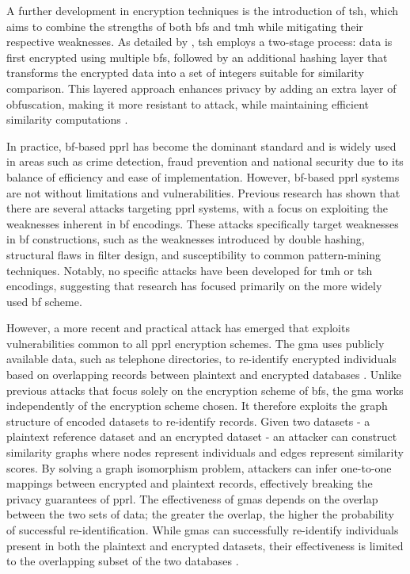A further development in encryption techniques is the introduction of \ac{tsh}, which aims to combine the strengths of both \ac{bf}s and \ac{tmh} while mitigating their respective weaknesses.
As detailed by \cite{ranbaduge2020secure}, \ac{tsh} employs a two-stage process: data is first encrypted using multiple \ac{bf}s, followed by an additional hashing layer that transforms the encrypted data into a set of integers suitable for similarity comparison. 
This layered approach enhances privacy by adding an extra layer of obfuscation, making it more resistant to attack, while maintaining efficient similarity computations \cite{vidanage2020graph, ranbaduge2020secure}.

In practice, \ac{bf}-based \ac{pprl} has become the dominant standard and is widely used in areas such as crime detection, fraud prevention and national security due to its balance of efficiency and ease of implementation.
However, \ac{bf}-based \ac{pprl} systems are not without limitations and vulnerabilities. 
Previous research has shown that there are several attacks targeting \ac{pprl} systems, with a focus on exploiting the weaknesses inherent in \ac{bf} encodings.
These attacks specifically target weaknesses in \ac{bf} constructions, such as the weaknesses introduced by double hashing, structural flaws in filter design, and susceptibility to common pattern-mining techniques. 
Notably, no specific attacks have been developed for \ac{tmh} or \ac{tsh} encodings, suggesting that research has focused primarily on the more widely used \ac{bf} scheme. \cite{vidanage2020graph}

However, a more recent and practical attack has emerged that exploits vulnerabilities common to all \ac{pprl} encryption schemes. 
The \ac{gma} uses publicly available data, such as telephone directories, to re-identify encrypted individuals based on overlapping records between plaintext and encrypted databases \cite{vidanage2020graph, schaefer2024}. 
Unlike previous attacks that focus solely on the encryption scheme of \ac{bf}s, the \ac{gma} works independently of the encryption scheme chosen.
It therefore exploits the graph structure of encoded datasets to re-identify records. Given two datasets - a plaintext reference dataset and an encrypted dataset - an attacker can construct similarity graphs where nodes represent individuals and edges represent similarity scores. 
By solving a graph isomorphism problem, attackers can infer one-to-one mappings between encrypted and plaintext records, effectively breaking the privacy guarantees of \ac{pprl}. 
The effectiveness of \ac{gma}s depends on the overlap between the two sets of data; the greater the overlap, the higher the probability of successful re-identification. 
While \ac{gma}s can successfully re-identify individuals present in both the plaintext and encrypted datasets, their effectiveness is limited to the overlapping subset of the two databases \cite{schaefer2024,vidanage2020graph}.

